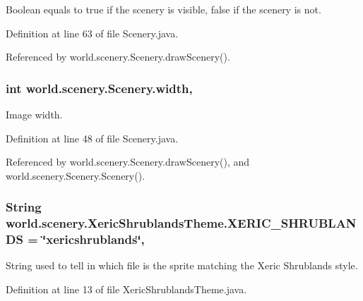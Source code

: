 Boolean equals to true if the scenery is visible, false if the scenery is not. 



Definition at line 63 of file Scenery.\-java.



Referenced by world.\-scenery.\-Scenery.\-draw\-Scenery().

\hypertarget{a00024_ad10b27080954e2fc06aa1718f47c4ce1}{
\subsubsection[{width}]{\setlength{\rightskip}{0pt plus 5cm}int world.\-scenery.\-Scenery.\-width\hspace{0.3cm}{\ttfamily [protected]}, {\ttfamily [inherited]}}}\label{a00024_ad10b27080954e2fc06aa1718f47c4ce1}


Image width. 



Definition at line 48 of file Scenery.\-java.



Referenced by world.\-scenery.\-Scenery.\-draw\-Scenery(), and world.\-scenery.\-Scenery.\-Scenery().

\hypertarget{a00040_a03cab029cbad9fdfa722122d3393c06c}{
\subsubsection[{X\-E\-R\-I\-C\-\_\-\-S\-H\-R\-U\-B\-L\-A\-N\-D\-S}]{\setlength{\rightskip}{0pt plus 5cm}String world.\-scenery.\-Xeric\-Shrublands\-Theme.\-X\-E\-R\-I\-C\-\_\-\-S\-H\-R\-U\-B\-L\-A\-N\-D\-S = \char`\"{}xericshrublands\char`\"{}\hspace{0.3cm}{\ttfamily [static]}, {\ttfamily [inherited]}}}\label{a00040_a03cab029cbad9fdfa722122d3393c06c}


String used to tell in which file is the sprite matching the Xeric Shrublands style. 



Definition at line 13 of file Xeric\-Shrublands\-Theme.\-java.

